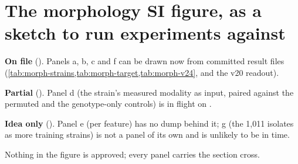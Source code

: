 
\section{The morphology SI figure, as a sketch to run experiments against}
\label{sec:sketch}

\begin{keybox}
\textbf{On file} (). Panels a, b, c and f can be drawn now from committed
result files (\cref{tab:morph-strains,tab:morph-target,tab:morph-v24}, and the v20 readout).

\textbf{Partial} (). Panel d (the strain's measured modality as input, paired
against the permuted and the genotype-only controls) is in flight on .

\textbf{Idea only} (). Panel e (per feature) has no dump behind it; g (the
1{,}011 isolates as more training strains) is not a panel of its own and is unlikely to be
in time.

Nothing in the figure is approved; every panel carries the section cross.
\end{keybox}

